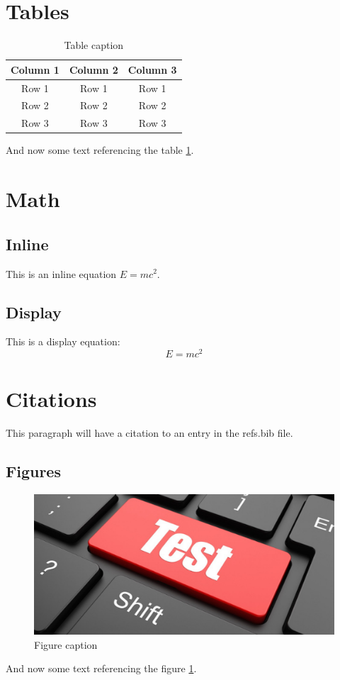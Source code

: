 \documentclass[12pt,twoside,a4paper]{article}
\begin{document}
\section{Tables}
\begin{table}[h]
    \centering
    \begin{tabular}{|c|c|c|}
        \hline
        Column 1 & Column 2 & Column 3 \\
        \hline
        Row 1 & Row 1 & Row 1 \\
        Row 2 & Row 2 & Row 2 \\
        Row 3 & Row 3 & Row 3 \\
        \hline
    \end{tabular}
    \caption{Table caption}
    \label{tab1}
\end{table}
And now some text referencing the table \ref{tab1}.
\section{Math}
\subsection{Inline}
This is an inline equation $E = mc^2$.
\subsection{Display}
This is a display equation:
\begin{equation}
E = mc^2
\end{equation}

\section{Citations}
This paragraph will have a citation to an entry in the refs.bib file. \cite{cite1}

\subsection{Figures}
\begin{figure}[h]
\includegraphics[width=\textwidth]{test.jpg}
    \centering
    \caption{Figure caption}
    \label{fig1}
\end{figure}

And now some text referencing the figure \ref{fig1}.
\newpage

\printbibliography[heading=bibintoc]
\end{document}
